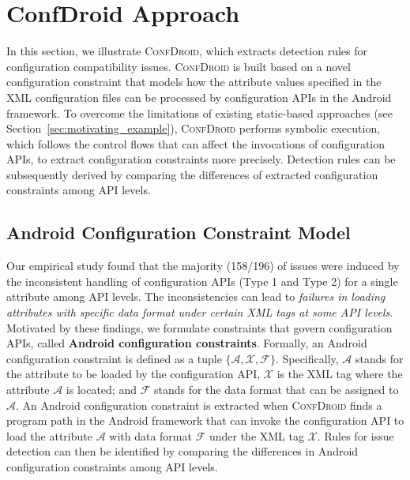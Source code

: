 \section{ConfDroid Approach}
\label{sec:4}
In this section, we illustrate \textsc{ConfDroid}, which extracts detection rules for configuration compatibility issues. 
\textsc{ConfDroid} is built based on a novel configuration constraint that models how the attribute values specified in the XML configuration files can be processed by configuration APIs in the Android framework.
To overcome the limitations of existing static-based approaches (see Section~\ref{sec:motivating_example}), \textsc{ConfDroid} performs symbolic execution, which follows the control flows that can affect the invocations of configuration APIs, to extract configuration constraints more precisely.
Detection rules can be subsequently derived by comparing the differences of extracted configuration constraints among API levels.

\subsection{Android Configuration Constraint Model}
\label{sec:4.1}
Our empirical study found that the majority (158/196) of issues were induced by the inconsistent handling
of configuration APIs (Type 1 and Type 2) for a single attribute among API levels. The inconsistencies
can lead to \textit{failures in loading
attributes with specific data format under certain
XML tags at some API levels}.
Motivated by these findings, we formulate constraints that govern configuration
APIs, called \textbf{Android configuration constraints}.
Formally, an Android configuration constraint is defined as a tuple
$\{\mathcal{A},\mathcal{X}, \mathcal{F}\}$.
Specifically, $\mathcal{A}$ stands for the attribute to be loaded by the configuration API,
$\mathcal{X}$ is the XML tag where the attribute $\mathcal{A}$ is located; and
$\mathcal{F}$ stands for the data format that can be assigned to $\mathcal{A}$.
An Android configuration constraint is extracted when
\textsc{ConfDroid} finds a
program path in the Android framework that can invoke the configuration API to
load the attribute $\mathcal{A}$ with data format $\mathcal{F}$ under the
XML tag $\mathcal{X}$.
Rules for issue detection can then be identified by comparing the
differences in Android configuration constraints among API levels.

